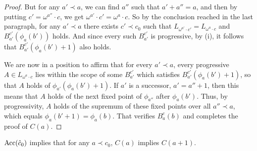 \documentclass{amsart}
\begin{document}
\begin{proof}
But for any $a' \prec a$, we can find $a''$ such that $a' + a'' = a$, and then by putting
$c' = \omega^{a''}\cdot c$, we get $\omega^{a'}\cdot c' = \omega^a\cdot c$. So by the
conclusion reached in the last paragraph, for any $a' \prec a$ there exists $c' \prec c_0$
such that $L_{\omega^{a'}\cdot c'} = L_{\omega^a\cdot c}$ and $B_{a'}^{c'}(\phi_a(b'))$
holds. And since every such $B_{a'}^{c'}$ is progressive,
by (i), it follows that $B_{a'}^{c'}(\phi_a(b') + 1)$ also holds.

We are now in a position to affirm that for every $a' \prec a$, every progressive
$A \in L_{\omega^a\cdot c}$ lies within the scope of some $B_{a'}^{c'}$ which satisfies
$B_{a'}^{c'}(\phi_a(b') + 1)$, so that $A$ holds of $\phi_{a'}(\phi_a(b') + 1)$. If $a'$ is a
successor, $a' = a'' + 1$, then this means that $A$ holds of the next fixed point of
$\phi_{a''}$ after $\phi_a(b')$. Thus, by progressivity, $A$ holds of the supremum of
these fixed points over all $a'' \prec a$, which equals $\phi_a(b'+1) = \phi_a(b)$. That
verifies $B_a^c(b)$ and completes the proof of $C(a)$.
\end{proof}

\begin{lemma}\label{lemma3}
${\rm Acc}(\hat{c}_0)$ implies that for any $a \prec c_0$, $C(a)$ implies $C(a + 1)$.
\end{lemma}
\end{document}
